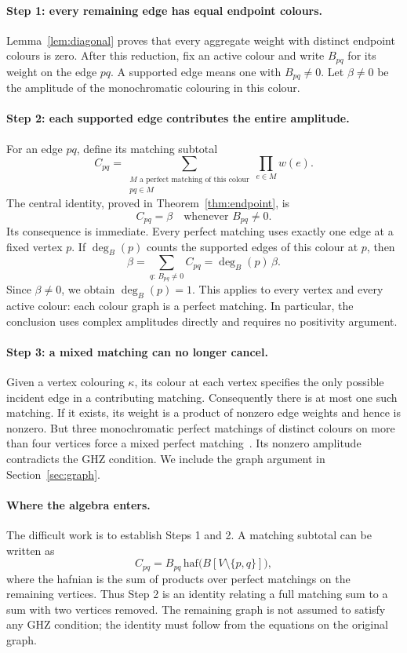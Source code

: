 \documentclass[11pt]{article}
\theoremstyle{definition}
\theoremstyle{plain}
\numberwithin{equation}{section}
\begin{document}
\paragraph{Step 1: every remaining edge has equal endpoint colours.}
Lemma~\ref{lem:diagonal} proves that every aggregate weight with distinct
endpoint colours is zero. After this reduction, fix an active colour and
write \(B_{pq}\) for its weight on the edge \(pq\). A supported edge means
one with \(B_{pq}\ne0\). Let \(\beta\ne0\) be the amplitude of the
monochromatic colouring in this colour.

\paragraph{Step 2: each supported edge contributes the entire amplitude.}
For an edge \(pq\), define its matching subtotal
\[
 C_{pq}=\sum_{\substack{M\text{ a perfect matching of this colour}\\pq\in M}}
              \prod_{e\in M}w(e).
\]
The central identity, proved in Theorem~\ref{thm:endpoint}, is
\[
 \boxed{C_{pq}=\beta\quad\text{whenever }B_{pq}\ne0.}
\]
Its consequence is immediate. Every perfect matching uses exactly one edge
at a fixed vertex \(p\). If \(\deg_B(p)\) counts the supported edges of
this colour at \(p\), then
\[
 \beta=\sum_{q:\,B_{pq}\ne0}C_{pq}=\deg_B(p)\,\beta.
\]
Since \(\beta\ne0\), we obtain \(\deg_B(p)=1\). This applies to every
vertex and every active colour: each colour graph is a perfect matching.
In particular, the conclusion uses complex amplitudes directly and requires
no positivity argument.

\paragraph{Step 3: a mixed matching can no longer cancel.}
Given a vertex colouring \(\kappa\), its colour at each vertex specifies
the only possible incident edge in a contributing matching. Consequently
there is at most one such matching. If it exists, its weight is a product
of nonzero edge weights and hence is nonzero. But three monochromatic
perfect matchings of distinct colours on more than four vertices force a
mixed perfect matching~\cite[Theorem~7]{cgi}. Its nonzero amplitude
contradicts the GHZ condition. We include the graph argument in
Section~\ref{sec:graph}.

\paragraph{Where the algebra enters.}
The difficult work is to establish Steps 1 and 2. A matching subtotal can be
written as
\[
 C_{pq}=B_{pq}\,\mathrm{haf}\bigl(B[V\setminus\{p,q\}]\bigr),
\]
where the hafnian is the sum of products over perfect matchings on the
remaining vertices. Thus Step 2 is an identity relating a full matching
sum to a sum with two vertices removed. The remaining graph is not assumed
to satisfy any GHZ condition; the identity must follow from the equations
on the original graph.
\end{document}
